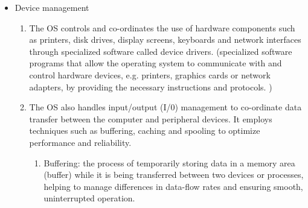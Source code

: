 \documentclass[a4paper,12pt]{article}
\begin{document}
\begin{itemize}
    \begin{enumerate}
        \item The OS employs a hierarchical file system to organize files in a logical and structured manner. Files are organized into directories (or folders), which can contain further directories, creating a tree-like structure. This organization makes it easier for users and applications to locate and manage data. 
        \item The OS allows a number of set file operations that users and applications can perform on the files and directories, including creating new files and directories; reading and writing data to files; deleting files; renaming files; and moving or copying files and directories to different locations. 
        \item To ensure consistency and avoid conflicts, the OS enforces rules for naming files, ensuring no two files in the same directory have the same name. Files often have extensions, like .jpg or .exe, to indicate the file type and associated application for opening these files.
        \item \textbf{Fragmentation} occurs over time as files are created, modified and deleted, causing them to be scattered across different sectors of the disk. Defragmentation aims to rearrange these file fragments into contiguous sequences, so improving system performance.
    \end{enumerate}
    \item Device management
    \begin{enumerate}
        \item The OS controls and co-ordinates the use of hardware components such as printers, disk drives, display screens, keyboards and network interfaces through specialized software called device drivers. (specialized software programs that allow the operating system to communicate with and control hardware devices, e.g. printers, graphics cards or network adapters, by providing 
the necessary instructions and protocols. )
	\item The OS also handles input/output (I/0) management to co-ordinate data transfer between the computer and peripheral devices. It employs techniques such as buffering, caching and spooling to optimize performance and reliability.
	\begin{enumerate}
	    \item Buffering: the process of temporarily storing data in a memory area (buffer) while it is being transferred between two devices or processes, helping to manage differences in data-flow rates and ensuring smooth, uninterrupted operation.

\end{enumerate}
\end{enumerate}
\end{itemize}
\end{document}
